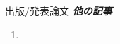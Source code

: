 \begin{rSection}{出版/発表論文}
\noindent\textbf{\textit{他の記事}}
\begin{enumerate}
\item {}
\end{enumerate}

\end{rSection}
